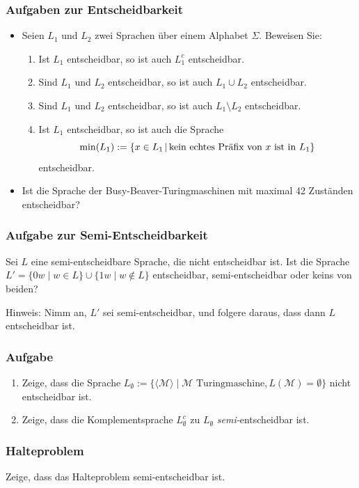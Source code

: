 \begin{frame}
\frametitle{Aufgaben zur Entscheidbarkeit}
\begin{itemize}
\item Seien $L_1$ und $L_2$ zwei Sprachen über einem Alphabet $\Sigma$.
Beweisen Sie:
\begin{enumerate}
\item Ist $L_1$ entscheidbar, so ist auch $L_1^c$ entscheidbar.
\item Sind $L_1$ und $L_2$ entscheidbar, so ist auch $L_1\cup L_2$ entscheidbar.
\item Sind $L_1$ und $L_2$ entscheidbar, so ist auch $L_1\setminus L_2$ entscheidbar.
\item Ist $L_1$ entscheidbar, so ist auch die Sprache 
$$\min(L_1):=\left\lbrace x\in L_1 \,\middle\vert\, \text{kein echtes Präfix von $x$ ist in }L_1 \right\rbrace$$
entscheidbar.
\end{enumerate}
\item Ist die Sprache der Busy-Beaver-Turingmaschinen mit maximal 42 Zuständen entscheidbar?
\end{itemize}
\end{frame}

\begin{frame}
 \frametitle{Aufgabe zur Semi-Entscheidbarkeit}
Sei $L$ eine semi-entscheidbare Sprache, die nicht entscheidbar ist. Ist die
Sprache $L'=\{0w \mid w \in L\} \cup \{1w \mid w \not\in L\}$ entscheidbar,
semi-entscheidbar oder keins von beiden?

Hinweis: Nimm an, $L'$ sei semi-entscheidbar, und folgere daraus, dass
dann $L$ entscheidbar ist. 
\end{frame}

\begin{frame}
   \frametitle{Aufgabe}
	\begin{enumerate}
\item Zeige, dass die Sprache $L_{\emptyset} := \{\langle \mathcal M \rangle \mid \mathcal M \text{ Turingmaschine}, L(\mathcal M) = \emptyset\}$ nicht entscheidbar ist.
\item Zeige, dass die Komplementsprache $L_{\emptyset}^c$ zu $L_{\emptyset}$ \emph{semi-}entscheidbar ist.
\end{enumerate}
\end{frame}


\begin{frame}
 \frametitle{Halteproblem}
 Zeige, dass das Halteproblem semi-entscheidbar ist.
\end{frame}

